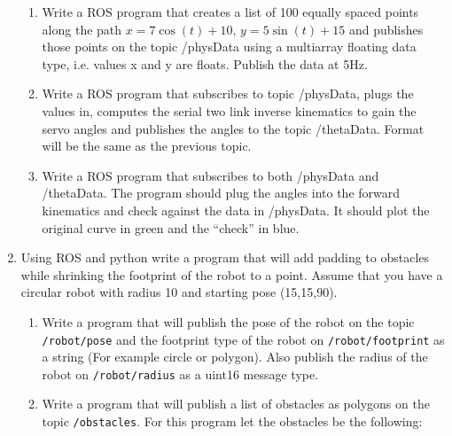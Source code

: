 \begin{enumerate}
  \begin{enumerate}
  \tightlist
  \item
    Write a ROS program that creates a list of 100 equally spaced points
    along the path \(x = 7\cos(t)+10\), \(y = 5\sin(t) + 15\) and
    publishes those points on the topic /physData using a multiarray
    floating data type, i.e. values x and y are floats. Publish the data
    at 5Hz.
  \item
    Write a ROS program that subscribes to topic /physData, plugs the
    values in, computes the serial two link inverse kinematics to gain
    the servo angles and publishes the angles to the topic /thetaData.
    Format will be the same as the previous topic.
  \item
    Write a ROS program that subscribes to both /physData and
    /thetaData. The program should plug the angles into the forward
    kinematics and check against the data in /physData. It should plot
    the original curve in green and the ``check'' in blue.
  \end{enumerate}
\item
  Using ROS and python write a program that will add padding to
  obstacles while shrinking the footprint of the robot to a point.
  Assume that you have a circular robot with radius 10 and starting pose
  (15,15,90).

  \begin{enumerate}
  \tightlist
  \item
    Write a program that will publish the pose of the robot on the topic
    \texttt{/robot/pose} and the footprint type of the robot on
    \texttt{/robot/footprint} as a string (For example circle or
    polygon). Also publish the radius of the robot on
    \texttt{/robot/radius} as a uint16 message type.
  \item
    Write a program that will publish a list of obstacles as polygons on
    the topic \texttt{/obstacles}. For this program let the obstacles be
    the following:


\end{enumerate}
\end{enumerate}
